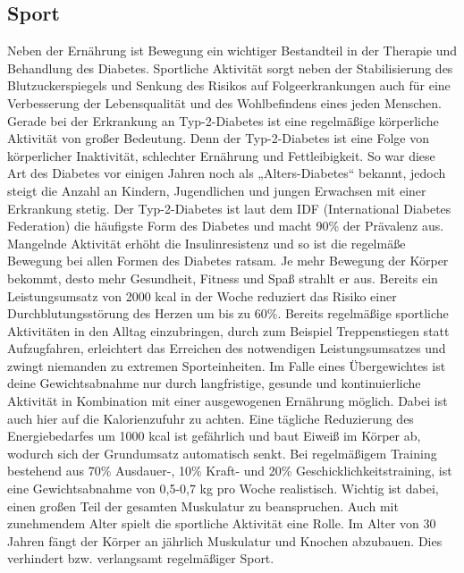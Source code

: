 \documentclass[a4paper,11pt]{article}%
\renewcommand{\\}{\vspace*{0.5\baselineskip} \newline}
\begin{document}
\subsection{Sport}
	Neben der Ernährung ist Bewegung ein wichtiger Bestandteil in der Therapie und Behandlung des Diabetes. Sportliche Aktivität sorgt neben der Stabilisierung des Blutzuckerspiegels und Senkung des Risikos auf Folgeerkrankungen auch für eine Verbesserung der Lebensqualität und des Wohlbefindens eines jeden Menschen.\cite{SG}\\
	Gerade bei der Erkrankung an Typ-2-Diabetes ist eine regelmäßige körperliche Aktivität von großer Bedeutung. Denn der Typ-2-Diabetes ist eine Folge von körperlicher Inaktivität, schlechter Ernährung und Fettleibigkeit. So war diese Art des Diabetes vor einigen Jahren noch als „Alters-Diabetes“ bekannt, jedoch steigt die Anzahl an Kindern, Jugendlichen und jungen Erwachsen mit einer Erkrankung stetig. Der Typ-2-Diabetes ist laut dem IDF (International Diabetes Federation) die häufigste Form des Diabetes und macht 90\% der Prävalenz aus.\cite{IDF}\newline
	Mangelnde Aktivität erhöht die Insulinresistenz und so ist die regelmäße Bewegung bei allen Formen des Diabetes ratsam. Je mehr Bewegung der Körper bekommt, desto mehr Gesundheit, Fitness und Spaß strahlt er aus. Bereits ein Leistungsumsatz von 2000 kcal in der Woche reduziert das Risiko einer Durchblutungsstörung des Herzen um bis zu 60\%. Bereits regelmäßige sportliche Aktivitäten in den Alltag einzubringen, durch zum Beispiel Treppenstiegen statt Aufzugfahren, erleichtert das Erreichen des notwendigen Leistungsumsatzes und zwingt niemanden zu extremen Sporteinheiten. \newline
	Im Falle eines Übergewichtes ist deine Gewichtsabnahme nur durch langfristige, gesunde und kontinuierliche Aktivität in Kombination mit einer ausgewogenen Ernährung möglich. Dabei ist auch hier auf die Kalorienzufuhr zu achten. Eine tägliche Reduzierung des Energiebedarfes um 1000 kcal ist gefährlich und baut Eiweiß im Körper ab, wodurch sich der Grundumsatz automatisch senkt.\newline 
	Bei regelmäßigem Training bestehend aus 70\% Ausdauer-, 10\% Kraft- und 20\% Geschicklichkeitstraining, ist eine Gewichtsabnahme von 0,5-0,7 kg pro Woche realistisch. Wichtig ist dabei, einen großen Teil der gesamten Muskulatur zu beanspruchen.\newline
	Auch mit zunehmendem Alter spielt die sportliche Aktivität eine Rolle. Im Alter von 30 Jahren fängt der Körper an jährlich Muskulatur und Knochen abzubauen. Dies verhindert bzw. verlangsamt regelmäßiger Sport. \newline
\end{document}
